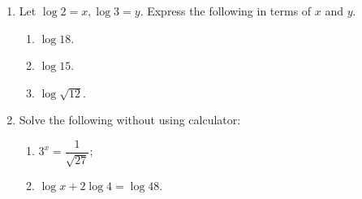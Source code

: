 \documentclass[11pt]{article}
\begin{document}
\begin{enumerate}
            \hrulefill
            
            \hrulefill
            
            \hrulefill
            
            \hrulefill
            
            \hrulefill
            
            \hrulefill
            
            \hrulefill
            
            \hrulefill

        \pagebreak
        \item Let $\log{2}=x, \log{3}=y$. Express the following in terms of $x$ and $y$.\begin{enumerate}
            \item $\log{18}$.
            \item $\log{15}$.
            \item $\log{\sqrt{12}}$.
        \end{enumerate}

        \hrulefill
            
            \hrulefill
            
            \hrulefill
            
            \hrulefill
            
            \hrulefill
            
            \hrulefill
            
            \hrulefill
            
            \hrulefill
            
            \hrulefill
            
            \hrulefill
            
            \hrulefill
            
            \hrulefill
            
            \hrulefill

        \item Solve the following without using calculator:\begin{enumerate}
            \item $3^x=\dfrac{1}{\sqrt{27}}$;
            \item $\log{x}+2\log{4}=\log{48}$.
        \end{enumerate}

        \hrulefill
            

\end{enumerate}
\end{document}
